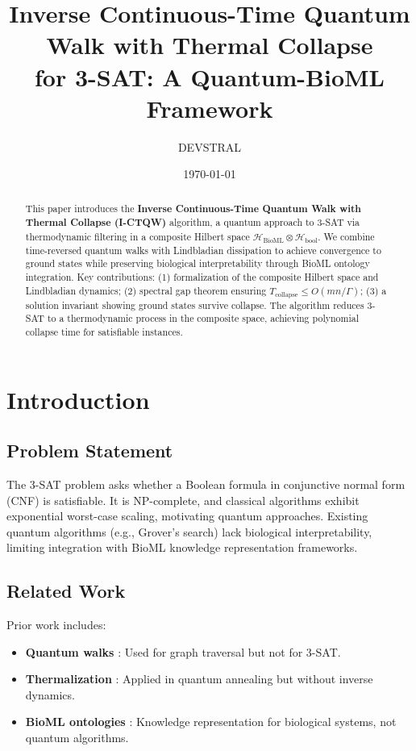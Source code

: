 \documentclass[12pt]{article}
\title{Inverse Continuous-Time Quantum Walk with Thermal Collapse\\
for 3-SAT: A Quantum-BioML Framework}
\author{DEVSTRAL}
\date{\today}
\begin{document}
\maketitle

\begin{abstract}
This paper introduces the \textbf{Inverse Continuous-Time Quantum Walk with Thermal Collapse
(I-CTQW)} algorithm, a quantum approach to 3-SAT via thermodynamic filtering in a
composite Hilbert space $\mathcal{H}_{\mathrm{BioML}} \otimes \mathcal{H}_{\mathrm{bool}}$.
We combine time-reversed quantum walks with Lindbladian dissipation to achieve convergence to
ground states while preserving biological interpretability through BioML ontology integration.
Key contributions: (1) formalization of the composite Hilbert space and Lindbladian dynamics;
(2) spectral gap theorem ensuring
$T_{\mathrm{collapse}} \leq O(mn/\Gamma)$; (3) a solution invariant showing ground states
survive collapse. The algorithm reduces 3-SAT to a thermodynamic process in the composite
space, achieving polynomial collapse time for satisfiable instances.
\end{abstract}

\section{Introduction}

\subsection{Problem Statement}

The 3-SAT problem asks whether a Boolean formula in conjunctive normal form (CNF) is
satisfiable. It is NP-complete, and classical algorithms exhibit exponential worst-case
scaling, motivating quantum approaches. Existing quantum algorithms (e.g., Grover's search)
lack biological interpretability, limiting integration with BioML knowledge representation
frameworks.

\subsection{Related Work}

Prior work includes:
\begin{itemize}
\item \textbf{Quantum walks} \cite{qw1}: Used for graph traversal but not for 3-SAT.
\item \textbf{Thermalization} \cite{thermal1}: Applied in quantum annealing but without
inverse dynamics.
\item \textbf{BioML ontologies} \cite{bioml1}: Knowledge representation for biological
systems, not quantum algorithms.
\end{itemize}
\end{document}
